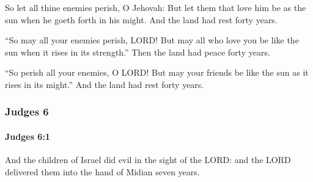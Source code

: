 			\begin{versebox}
					\item[BHS] 
					\item[ASV] So let all thine enemies perish, O Jehovah: But let them that love him be as the sun when he goeth forth in his might. And the land had rest forty years.
					\item[NIV] “So may all your enemies perish, LORD! But may all who love you be like the sun when it rises in its strength.” Then the land had peace forty years.
					\item[NRSV] “So perish all your enemies, O LORD! But may your friends be like the sun as it rises in its might.” And the land had rest forty years.
			\end{versebox}
	\subsubsection{Judges 6} %
		\label{JUDGES-6}

		\paragraph{Judges 6:1} %
			\label{JUDGES-6-1}

			And the children of Israel did evil in the sight of the LORD: and the LORD delivered them into the hand of Midian seven years.

